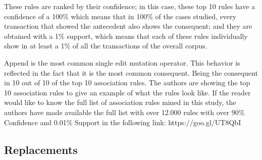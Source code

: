 \documentclass[conference]{IEEEtran}
\begin{document}
These rules are ranked by their confidence; in this case, these top 10 rules have a confidence of a 100\% which means that in 100\% of the cases studied, every transaction that showed the antecedent also shows the consequent; and they are obtained with a 1\% support, which means that each of these rules individually show in at least a 1\% of all the transactions of the overall corpus.

Append is the most common single edit mutation operator. This behavior is reflected in the fact that it is the most common consequent. Being the consequent in 10 out of 10 of the top 10 association rules. The authors are showing the top 10 association rules to give an example of what the rules look like. If the reader would like to know the full list of association rules mined in this study, the authors have made available the full list with over 12.000 rules with over 90\% Confidence and 0.01\% Support in the following link: https://goo.gl/UT8QbI





\subsection{Replacements}
\end{document}
